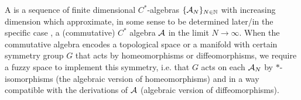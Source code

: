 

    
    
    
    
\linea

A  is a sequence of finite dimensional $C^*$-algebras $\{\mathcal A_N\}_{N \in \mathbb{N}}$ with increasing dimension which approximate, in some sense to be determined later/in the specific case , a (commutative) $C^*$ algebra $\mathcal A$ in the limit $N \to \infty$. When the commutative algebra encodes a topological space or a manifold with certain symmetry group $G$ that acts by homeomorphisms or diffeomorphisms, we require a fuzzy space to implement this symmetry, i.e. that $G$ acts on each $\mathcal A_N$ by $*$-isomorphisms (the algebraic version of homeomorphisms) and in a way compatible with the derivations of $\mathcal A$ (algebraic version of diffeomorphisms).


